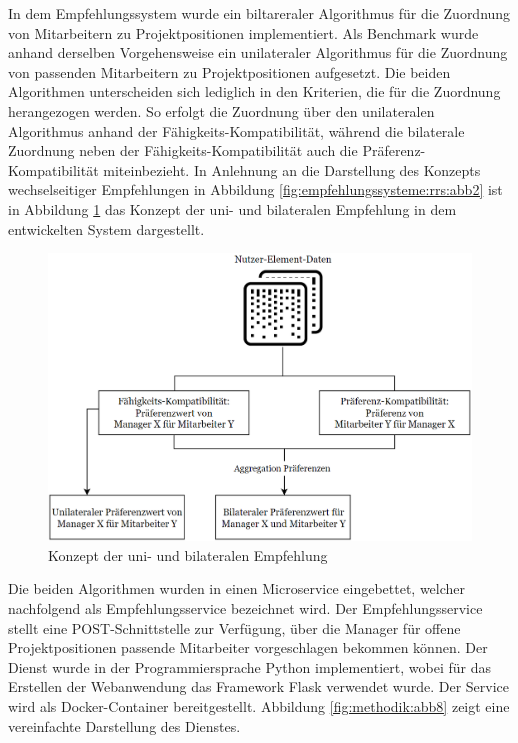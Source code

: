 In dem Empfehlungssystem wurde ein biltareraler Algorithmus für die Zuordnung von Mitarbeitern zu Projektpositionen implementiert.
Als Benchmark wurde anhand derselben Vorgehensweise ein unilateraler Algorithmus für die Zuordnung von passenden Mitarbeitern zu Projektpositionen aufgesetzt.
Die beiden Algorithmen unterscheiden sich lediglich in den Kriterien, die für die Zuordnung herangezogen werden.
So erfolgt die Zuordnung über den unilateralen Algorithmus anhand der Fähigkeits-Kompatibilität, während die bilaterale Zuordnung neben der Fähigkeits-Kompatibilität auch die Präferenz-Kompatibilität miteinbezieht.
In Anlehnung an die Darstellung des Konzepts wechselseitiger Empfehlungen in Abbildung \ref{fig:empfehlungssysteme:rrs:abb2} ist in Abbildung \ref{fig:methodik:abb9} das Konzept der uni- und bilateralen Empfehlung in dem entwickelten System dargestellt.

\begin{figure}[H]
    \centering
	\includegraphics[width=1.0\textwidth]{gfx/concept-rrs-in-praxis.png}
	\caption[Konzept der der uni- und bilateralen Empfehlung]{Konzept der uni- und bilateralen Empfehlung}
	\label{fig:methodik:abb9}
\end{figure}

Die beiden Algorithmen wurden in einen Microservice eingebettet, welcher nachfolgend als Empfehlungsservice bezeichnet wird.
Der Empfehlungsservice stellt eine POST-Schnittstelle zur Verfügung, über die Manager für offene Projektpositionen passende Mitarbeiter vorgeschlagen bekommen können.
Der Dienst wurde in der Programmiersprache Python implementiert, wobei für das Erstellen der Webanwendung das Framework Flask verwendet wurde.
Der Service wird als Docker-Container bereitgestellt.
Abbildung \ref{fig:methodik:abb8} zeigt eine vereinfachte Darstellung des Dienstes.

